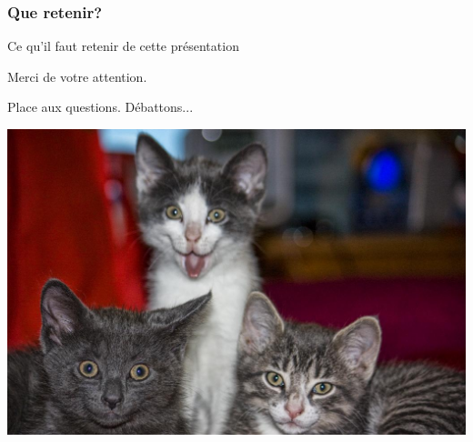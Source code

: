 \documentclass{beamer}
\begin{document}
\begin{frame}
\frametitle{Que retenir?}

\begin{block}{Ce qu'il faut retenir de cette présentation}
\end{block}
\end{frame}


\begin{frame}
\Huge{\centerline{Merci de votre attention.}}
\Huge{\centerline{Place aux questions. Débattons...}}
\begin{center}
\includegraphics[scale=0.2]{./images/chat.jpg}
\end{center}

\end{frame}
\end{document}
